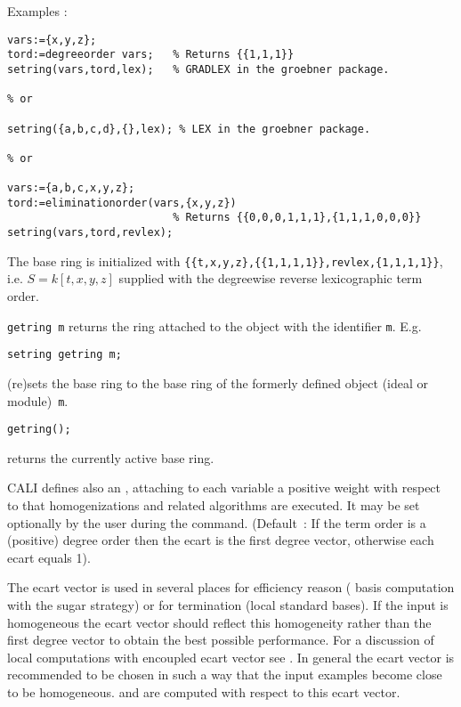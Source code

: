 \noindent Examples :
\begin{verbatim}
vars:={x,y,z};
tord:=degreeorder vars;   % Returns {{1,1,1}}
setring(vars,tord,lex);   % GRADLEX in the groebner package.

% or

setring({a,b,c,d},{},lex); % LEX in the groebner package.

% or

vars:={a,b,c,x,y,z};
tord:=eliminationorder(vars,{x,y,z}) 
                          % Returns {{0,0,0,1,1,1},{1,1,1,0,0,0}}
setring(vars,tord,revlex);                          
\end{verbatim}
\pagebreak[2]

The base ring is initialized with \newline
\verb|{{t,x,y,z},{{1,1,1,1}},revlex,{1,1,1,1}}|,\newline 
i.e. $S=k[t,x,y,z]$ supplied with the degreewise reverse
lexicographic term order.
\medskip

\noindent\verb|getring m| returns the ring attached to
the object with the identifier {\tt m}. E.g.
\begin{verbatim}
setring getring m;
\end{verbatim}
(re)sets the base ring to the base ring of the formerly defined
object (ideal or module)~{\tt m}.
\begin{verbatim}
getring();
\end{verbatim}
returns the currently active base ring.

CALI defines also an , attaching to each variable a
positive weight with respect to that homogenizations and related
algorithms are executed. It may be set optionally by the user during
the  command.  (Default~: If the term order is a
(positive) degree order then the ecart is the first degree vector,
otherwise each ecart equals 1).

The ecart vector is used in several places for efficiency reason (\gr
basis computation with the sugar strategy) or for termination (local
standard bases). If the input is homogeneous the ecart vector should
reflect this homogeneity rather than the first degree vector to
obtain the best possible performance. For a discussion of local
computations with encoupled ecart vector see \cite{Gr23}. In general
the ecart vector is recommended to be chosen in such a way that the
input examples become close to be homogeneous. 
and  are computed with respect to this ecart
vector.
\medskip

